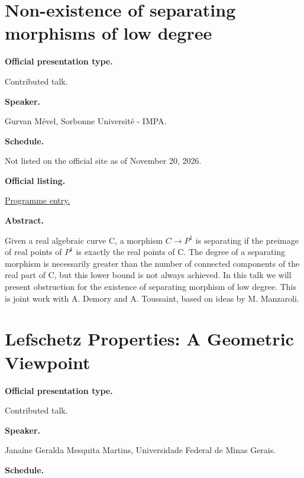 \section{Non-existence of separating
morphisms of low degree}
\label{section-non-existence-of-separating}

\medskip\noindent
{\bf Official presentation type.}

Contributed talk.

\medskip\noindent
{\bf Speaker.}

Gurvan Mével, Sorbonne Université - IMPA.

\medskip\noindent
{\bf Schedule.}

Not listed on the official site as of
November 20, 2026.

\medskip\noindent
{\bf Official listing.}

\href{%
https://sites.google.com/view/%
geoalgcompluff/legal/%
legal-2027-resumos#h.dant8g3oe5ea%
}{Programme entry.}

\medskip\noindent
{\bf Abstract.}

Given a real algebraic curve C, a morphism $C
\to P^1$ is separating if the preimage of
real points of $P^1$ is exactly the real
points of C. The degree of a separating
morphism is necessarily greater than the
number of connected components of the real
part of C, but this lower bound is not always
achieved. In this talk we will present
obstruction for the existence of separating
morphism of low degree. This is joint work
with A. Demory and A. Toussaint, based on
ideas by M. Manzaroli.

\section{Lefschetz Properties: A Geometric
Viewpoint}
\label{section-lefschetz-properties-a}

\medskip\noindent
{\bf Official presentation type.}

Contributed talk.

\medskip\noindent
{\bf Speaker.}

Janaíne Geralda Mesquita Martins,
Universidade Federal de Minas Gerais.

\medskip\noindent
{\bf Schedule.}

